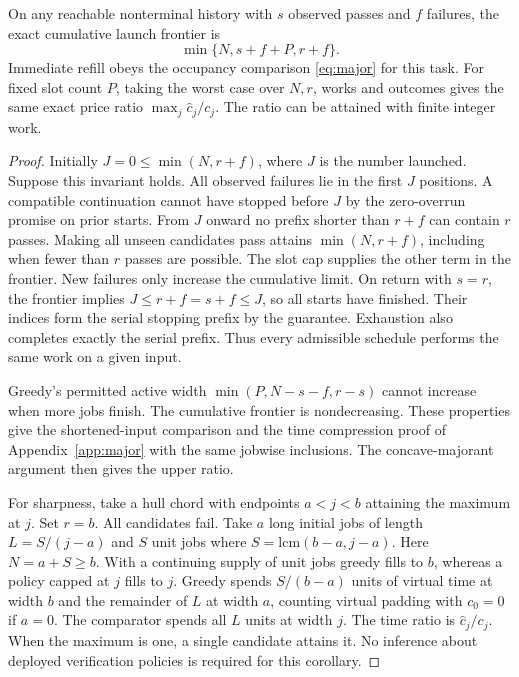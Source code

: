 \begin{proposition}
On any reachable nonterminal history with $s$ observed passes and $f$ failures, the exact cumulative launch frontier is
\[
       \min\{N,s+f+P,r+f\}.
\]
Immediate refill obeys the occupancy comparison \eqref{eq:major} for this task. For fixed slot count $P$, taking the worst case over $N,r$, works and outcomes gives the same exact price ratio $\max_j\widehat c_j/c_j$. The ratio can be attained with finite integer work.
\end{proposition}
\begin{proof}
Initially $J=0\le\min(N,r+f)$, where $J$ is the number launched. Suppose this invariant holds. All observed failures lie in the first $J$ positions. A compatible continuation cannot have stopped before $J$ by the zero-overrun promise on prior starts. From $J$ onward no prefix shorter than $r+f$ can contain $r$ passes. Making all unseen candidates pass attains $\min(N,r+f)$, including when fewer than $r$ passes are possible. The slot cap supplies the other term in the frontier. New failures only increase the cumulative limit. On return with $s=r$, the frontier implies $J\le r+f=s+f\le J$, so all starts have finished. Their indices form the serial stopping prefix by the guarantee. Exhaustion also completes exactly the serial prefix. Thus every admissible schedule performs the same work on a given input.

Greedy's permitted active width $\min(P,N-s-f,r-s)$ cannot increase when more jobs finish. The cumulative frontier is nondecreasing. These properties give the shortened-input comparison and the time compression proof of Appendix~\ref{app:major} with the same jobwise inclusions. The concave-majorant argument then gives the upper ratio.

For sharpness, take a hull chord with endpoints $a<j<b$ attaining the maximum at $j$. Set $r=b$. All candidates fail. Take $a$ long initial jobs of length $L=S/(j-a)$ and $S$ unit jobs where $S=\mathrm{lcm}(b-a,j-a)$. Here $N=a+S\ge b$. With a continuing supply of unit jobs greedy fills to $b$, whereas a policy capped at $j$ fills to $j$. Greedy spends $S/(b-a)$ units of virtual time at width $b$ and the remainder of $L$ at width $a$, counting virtual padding with $c_0=0$ if $a=0$. The comparator spends all $L$ units at width $j$. The time ratio is $\widehat c_j/c_j$. When the maximum is one, a single candidate attains it. No inference about deployed verification policies is required for this corollary.
\end{proof}
